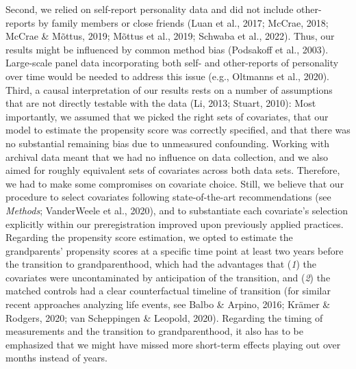\documentclass[
  english,
  man,floatsintext]{apa7}
\begin{document}
Second, we relied on self-report personality data and did not include other-reports by family members or close friends (Luan et al., 2017; McCrae, 2018; McCrae \& Mõttus, 2019; Mõttus et al., 2019; Schwaba et al., 2022). Thus, our results might be influenced by common method bias (Podsakoff et al., 2003). Large-scale panel data incorporating both self- and other-reports of personality over time would be needed to address this issue (e.g., Oltmanns et al., 2020).\\
Third, a causal interpretation of our results rests on a number of assumptions that are not directly testable with the data (Li, 2013; Stuart, 2010): Most importantly, we assumed that we picked the right sets of covariates, that our model to estimate the propensity score was correctly specified, and that there was no substantial remaining bias due to unmeasured confounding. Working with archival data meant that we had no influence on data collection, and we also aimed for roughly equivalent sets of covariates across both data sets. Therefore, we had to make some compromises on covariate choice. Still, we believe that our procedure to select covariates following state-of-the-art recommendations (see \emph{Methods}; VanderWeele et al., 2020), and to substantiate each covariate's selection explicitly within our preregistration improved upon previously applied practices. Regarding the propensity score estimation, we opted to estimate the grandparents' propensity scores at a specific time point at least two years before the transition to grandparenthood, which had the advantages that (\emph{1}) the covariates were uncontaminated by anticipation of the transition, and (\emph{2}) the matched controls had a clear counterfactual timeline of transition (for similar recent approaches analyzing life events, see Balbo \& Arpino, 2016; Krämer \& Rodgers, 2020; van Scheppingen \& Leopold, 2020). Regarding the timing of measurements and the transition to grandparenthood, it also has to be emphasized that we might have missed more short-term effects playing out over months instead of years.\\
\end{document}
